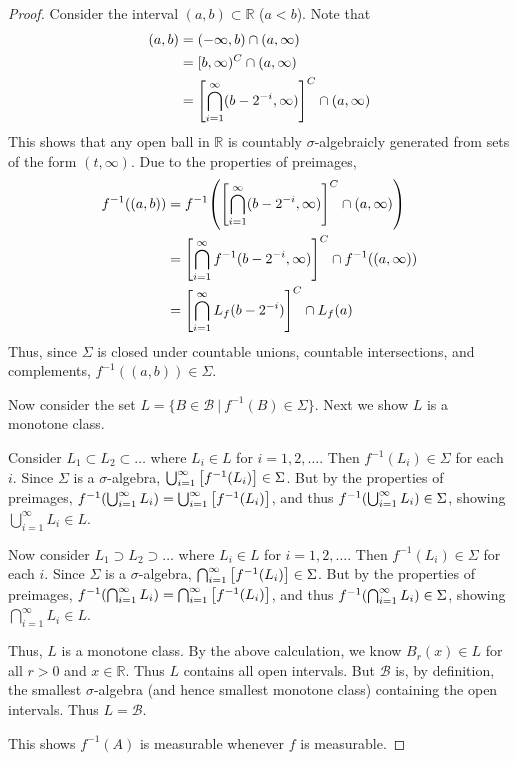 \documentclass[12pt]{article}
\theoremstyle{plain}
\begin{document}
\begin{proof}
    Consider the interval $(a, b) \subset \mathbb{R}$ ($a < b$).  Note that
    \begin{align*}
        (a, b) &= (-\infty, b) \cap (a, \infty) \\
        &= [b, \infty)^C \cap (a, \infty) \\
        &= \qty[\bigcap_{i = 1}^\infty(b - 2^{-i}, \infty)]^C \cap (a, \infty)
    \end{align*}
    This shows that any open ball in $\mathbb{R}$ is countably $\sigma$-algebraicly generated from sets of the form $(t, \infty)$.  Due to the properties of preimages,
    \begin{align*}
        f^{-1}((a,b)) &= f^{-1}\qty(\qty[\bigcap_{i=1}^\infty (b - 2^{-i}, \infty)]^C \cap (a, \infty)) \\
        &= \qty[\bigcap_{i=1}^\infty f^{-1}(b - 2^{-i}, \infty)]^C \cap f^{-1}((a, \infty)) \\
        &= \qty[\bigcap_{i=1}^\infty L_f(b - 2^{-i})]^C \cap L_f(a)
    \end{align*}
    Thus, since $\Sigma$ is closed under countable unions, countable intersections, and complements, $f^{-1}((a,b)) \in \Sigma$.

    Now consider the set $L = \{B \in \mathcal{B}\ |\ f^{-1}(B) \in \Sigma\}$.  Next we show $L$ is a monotone class.

    Consider $L_1 \subset L_2 \subset \dots$ where $L_i \in L$ for $i = 1, 2, \dots$.  Then $f^{-1}(L_i) \in \Sigma$ for each $i$.  Since $\Sigma$ is a $\sigma$-algebra, $\bigcup_{i=1}^\infty\qty[f^{-1}(L_i)] \in \Sigma$.  But by the properties of preimages, $f^{-1}\qty(\bigcup_{i=1}^\infty L_i) = \bigcup_{i=1}^\infty\qty[f^{-1}(L_i)]$, and thus $f^{-1}\qty(\bigcup_{i=1}^\infty L_i) \in \Sigma$, showing $\bigcup_{i=1}^\infty L_i \in L$.

    Now consider $L_1 \supset L_2 \supset \dots$ where $L_i \in L$ for $i = 1, 2, \dots$.  Then $f^{-1}(L_i) \in \Sigma$ for each $i$.  Since $\Sigma$ is a $\sigma$-algebra, $\bigcap_{i=1}^\infty\qty[f^{-1}(L_i)] \in \Sigma$.  But by the properties of preimages, $f^{-1}\qty(\bigcap_{i=1}^\infty L_i) = \bigcap_{i=1}^\infty\qty[f^{-1}(L_i)]$, and thus $f^{-1}\qty(\bigcap_{i=1}^\infty L_i) \in \Sigma$, showing $\bigcap_{i=1}^\infty L_i \in L$.

    Thus, $L$ is a monotone class.  By the above calculation, we know $B_r(x) \in L$ for all $r > 0$ and $x \in \mathbb{R}$.  Thus $L$ contains all open intervals.  But $\mathcal{B}$ is, by definition, the smallest $\sigma$-algebra (and hence smallest monotone class) containing the open intervals.  Thus $L = \mathcal{B}$.

    This shows $f^{-1}(A)$ is measurable whenever $f$ is measurable.
\end{proof}
\end{document}
